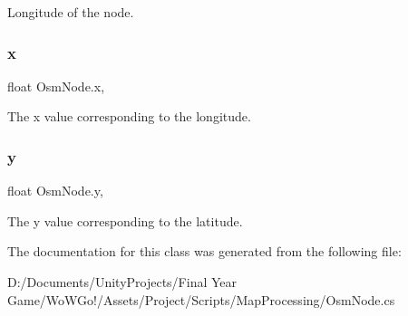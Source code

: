Longitude of the node. 

\mbox{\label{class_osm_node_ac27a7d0bdad566917ca5d11dcc311f04}} 
\subsubsection{\texorpdfstring{x}{x}}
{\footnotesize\ttfamily float Osm\+Node.\+x\hspace{0.3cm}{\ttfamily [get]}, {}}



The x value corresponding to the longitude. 

\mbox{\label{class_osm_node_a4873f9b229e3aa49eabaaa4b7feb6666}} 
\subsubsection{\texorpdfstring{y}{y}}
{\footnotesize\ttfamily float Osm\+Node.\+y\hspace{0.3cm}{\ttfamily [get]}, {}}



The y value corresponding to the latitude. 



The documentation for this class was generated from the following file\+:\begin{DoxyCompactItemize}
\item 
D\+:/\+Documents/\+Unity\+Projects/\+Final Year Game/\+Wo\+W\+Go!/\+Assets/\+Project/\+Scripts/\+Map\+Processing/Osm\+Node.\+cs\end{DoxyCompactItemize}
